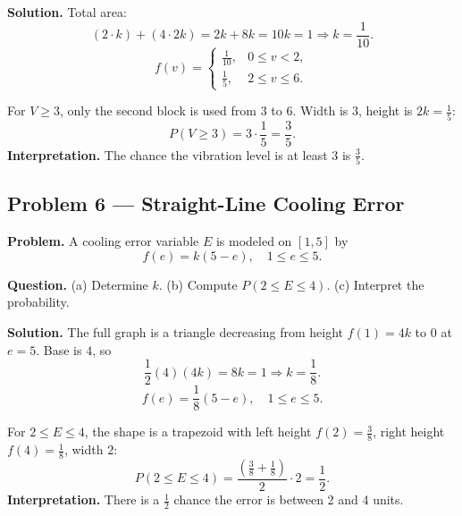 \begin{ExamProblems}
		\textbf{Solution.}
		Total area:
		\[
		(2\cdot k)+(4\cdot 2k)=2k+8k=10k=1\Rightarrow k=\frac{1}{10}.
		\]
		\[
		f(v)=\begin{cases}
		\frac{1}{10}, & 0\le v<2,\\
		\frac{1}{5}, & 2\le v\le 6.
		\end{cases}
		\]
		\begin{center}
		\end{center}
		For $V\ge 3$, only the second block is used from $3$ to $6$.
		Width is $3$, height is $2k=\frac{1}{5}$:
		\[
		P(V\ge 3)=3\cdot\frac{1}{5}=\frac{3}{5}.
		\]
		\textbf{Interpretation.} The chance the vibration level is at least 3 is $\frac{3}{5}$.
		
		
		\item
		\subsection*{Problem 6 — Straight-Line Cooling Error}
		
		\textbf{Problem.}
		A cooling error variable $E$ is modeled on $[1,5]$ by
		\[
		f(e)=k(5-e),\quad 1\le e\le 5.
		\]
		
		\textbf{Question.}
		(a) Determine $k$.
		(b) Compute $P(2\le E\le 4)$.
		(c) Interpret the probability.
		
		\textbf{Solution.}
		The full graph is a triangle decreasing from height $f(1)=4k$ to 0 at $e=5$.
		Base is $4$, so
		\[
		\frac{1}{2}(4)(4k)=8k=1\Rightarrow k=\frac{1}{8}.
		\]
		\[
		f(e)=\frac{1}{8}(5-e),\quad 1\le e\le 5.
		\]
		\begin{center}
		\end{center}
		For $2\le E\le 4$, the shape is a trapezoid with
		left height $f(2)=\frac{3}{8}$, right height $f(4)=\frac{1}{8}$, width $2$:
		\[
		P(2\le E\le 4)=\frac{\left(\frac{3}{8}+\frac{1}{8}\right)}{2}\cdot 2
		=\frac{1}{2}.
		\]
		\textbf{Interpretation.} There is a $\frac{1}{2}$ chance the error is between 2 and 4 units.
		

\end{ExamProblems}
